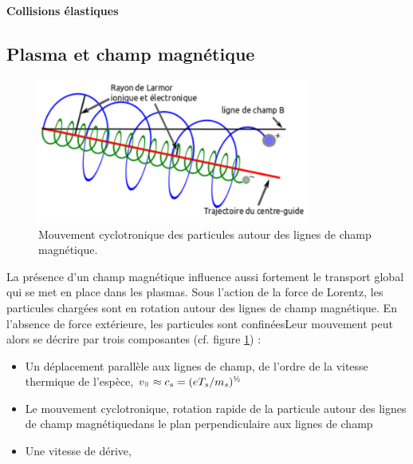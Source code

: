 			\textbf{Collisions élastiques}
			
		\subsection{Plasma et champ magnétique}
			\begin{figure}
				\centering
				\includegraphics[width=0.8\textwidth]{figures/mouvementCyclotron.png}
				{\caption{Mouvement cyclotronique des particules autour des lignes de champ
				magnétique.}\label{1-particleDrifts}}
			\end{figure}
			La présence d'un champ magnétique influence aussi fortement le transport global qui 
			se met en place dans les plasmas. Sous l'action de la force de Lorentz, les particules 
			chargées sont en rotation autour des lignes de champ magnétique. En l'absence de force 
			extérieure, les particules sont confinéesLeur mouvement peut alors
			se décrire par trois composantes (cf. figure \ref{1-particleDrifts}) :			
			\begin{itemize}
			\item Un déplacement parallèle aux lignes de champ, de l'ordre de la vitesse
			thermique de l'espèce, $v_\para\approx c_s=(eT_s/m_s)^{\text{\textonehalf}}$
			\item Le mouvement cyclotronique, rotation rapide de la particule
			autour des lignes de champ magnétiquedans le plan perpendiculaire aux lignes
			de champ
			\item Une vitesse de dérive, 
			\end{itemize}
			\
			

